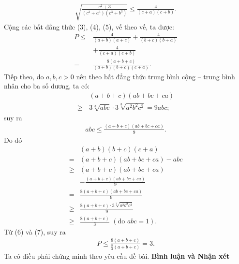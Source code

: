 \begin{multicols}{2}
\begin{align*}
		\sqrt {\!\!\frac{{{c^2} \!+\! 3}}{{\left( {{c^3} \!+\! {a^3}} \right)\!\left( {{c^3} \!+\! {b^3}} \right)}}}  \!\le\! \frac{4}{{\left( {c \!+\! a} \right)\!\left( {c \!+\! b} \right)}}. \tag{$5$}
	\end{align*}
	Cộng các bất đẳng thức ($3$), ($4$), ($5$), vế theo vế, ta được:
	\begin{align*}
		P \le &\frac{4}{{\left( {a + b} \right)\left( {a + c} \right)}} + \frac{4}{{\left( {b + c} \right)\left( {b + a} \right)}} \\
		&+ \frac{4}{{\left( {c + a} \right)\left( {c + b} \right)}} \\
		= &\frac{{8\left( {a + b + c} \right)}}{{\left( {a + b} \right)\left( {b + c} \right)\left( {c + a} \right)}}. \tag{$6$}
	\end{align*}
	Tiếp theo, do $a, b, c > 0$ nên theo bất đẳng thức trung bình cộng -- trung bình nhân cho ba số dương, ta có:
	\begin{align*}
		&\left( {a + b + c} \right)\left( {ab + bc + ca} \right)\\
		 \ge \,&3\sqrt[3]{{abc}} \cdot 3\sqrt[3]{{{a^2}{b^2}{c^2}}} = 9abc;
	\end{align*}
	suy ra
	\begin{align*}
		abc \le \frac{{\left( {a + b + c} \right)\left( {ab + bc + ca} \right)}}{9}.
	\end{align*}
	Do đó
	\begin{align*}
		&\left( {a + b} \right)\left( {b + c} \right)\left( {c + a} \right) \\
		= &\left( {a + b + c} \right)\left( {ab + bc + ca} \right) - abc\\
		\ge& \left( {a + b + c} \right)\left( {ab + bc + ca} \right) \\
		&- \frac{{\left( {a + b + c} \right)\left( {ab + bc + ca} \right)}}{9}\\
		= &\frac{{8\left( {a + b + c} \right)\left( {ab + bc + ca} \right)}}{9}\\
		\ge& \frac{{8\left( {a + b + c} \right) \cdot 3\sqrt[3]{{{a^2}{b^2}{c^2}}}}}{9}\\
		\ge &\frac{{8\left( {a + b + c} \right)}}{3}\,\,({\text{do }}abc = 1).
	\end{align*}
	Từ ($6$) và ($7$), suy ra
	\begin{align*}
		P \le \frac{{8\left( {a + b + c} \right)}}{{\frac{8}{3}\left( {a + b + c} \right)}} = 3.
	\end{align*}
	Ta có điều phải chứng minh theo yêu cầu đề bài.
	\vskip 0.05cm
	\textbf{\color{thachthuctoanhoc}Bình luận và Nhận xét}

\end{multicols}
